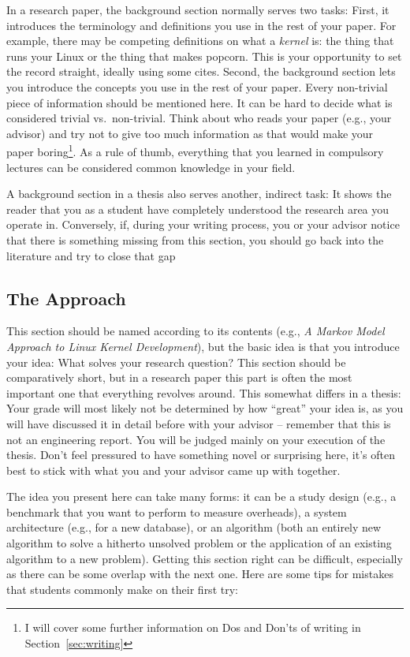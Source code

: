 \documentclass[a4]{article}
\begin{document}
In a research paper, the background section normally serves two tasks:
First, it introduces the terminology and definitions you use in the rest of your paper.
For example, there may be competing definitions on what a \emph{kernel} is: the thing that runs your Linux or the thing that makes popcorn.
This is your opportunity to set the record straight, ideally using some cites.
Second, the background section lets you introduce the concepts you use in the rest of your paper.
Every non-trivial piece of information should be mentioned here.
It can be hard to decide what is considered trivial vs.~non-trivial.
Think about who reads your paper (e.g., your advisor) and try not to give too much information as that would make your paper boring\footnote{I will cover some further information on Dos and Don'ts of writing in Section~\ref{sec:writing}}.
As a rule of thumb, everything that you learned in compulsory lectures can be considered common knowledge in your field.

A background section in a thesis also serves another, indirect task:
It shows the reader that you as a student have completely understood the research area you operate in.
Conversely, if, during your writing process, you or your advisor notice that there is something missing from this section, you should go back into the literature and try to close that gap

\subsection{The Approach}

This section should be named according to its contents (e.g., \emph{A Markov Model Approach to Linux Kernel Development}), but the basic idea is that you introduce your idea: What solves your research question?
This section should be comparatively short, but in a research paper this part is often the most important one that everything revolves around.
This somewhat differs in a thesis: Your grade will most likely not be determined by how ``great'' your idea is, as you will have discussed it in detail before with your advisor -- remember that this is not an engineering report.
You will be judged mainly on your execution of the thesis.
Don't feel pressured to have something novel or surprising here, it's often best to stick with what you and your advisor came up with together.

The idea you present here can take many forms: it can be a study design (e.g., a benchmark that you want to perform to measure overheads), a system architecture (e.g., for a new database), or an algorithm (both an entirely new algorithm to solve a hitherto unsolved problem or the application of an existing algorithm to a new problem).
Getting this section right can be difficult, especially as there can be some overlap with the next one.
Here are some tips for mistakes that students commonly make on their first try:
\end{document}
